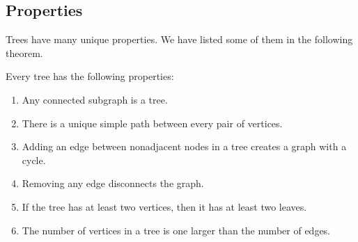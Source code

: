 \subsection{Properties}

Trees have many unique properties.  We have listed some of them in the
following theorem.

\begin{theorem}\label{th:treeprops}
Every tree has the following properties:

\begin{enumerate}

\item Any connected subgraph is a tree.\label{asub}

\item There is a unique simple path between every pair of vertices.

\item Adding an edge between nonadjacent nodes in a tree creates a
  graph with a cycle.

\item Removing any edge disconnects the graph.

\item If the tree has at least two vertices, then it has at least two
  leaves.

\item The number of vertices in a tree is one larger than the number
  of edges.

\end{enumerate}
\end{theorem}

